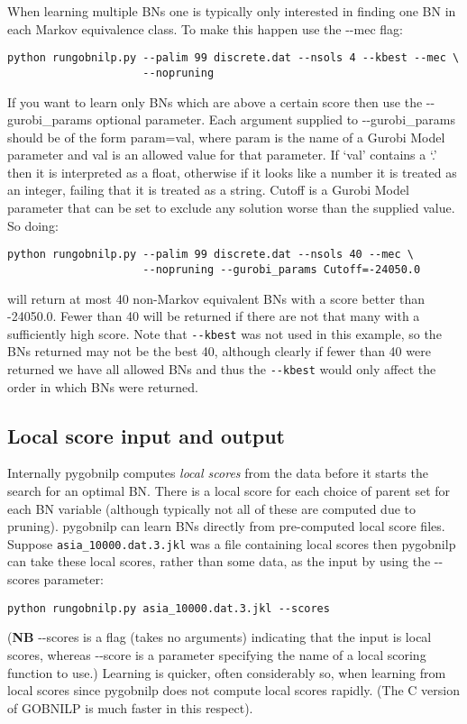 \documentclass{article}
\newcommand{\pygobnilp}{\textsf{pygobnilp}}
\begin{document}
When learning multiple BNs one is typically only interested in finding
one BN in each Markov equivalence class. To make this happen use the
-{}-mec flag:

\begin{verbatim}
python rungobnilp.py --palim 99 discrete.dat --nsols 4 --kbest --mec \
                     --nopruning
\end{verbatim}

If you want to learn only BNs which are above a certain score then use
the \mbox{-{}-gurobi\_params} optional parameter. Each argument
supplied to -{}-gurobi\_params should be of the form param=val, where
param is the name of a Gurobi Model parameter and val is an allowed
value for that parameter. If `val' contains a `.' then it is
interpreted as a float, otherwise if it looks like a number it is
treated as an integer, failing that it is treated as a string. Cutoff
is a Gurobi Model parameter that can be set to exclude any solution
worse than the supplied value. So doing:

\begin{verbatim}
python rungobnilp.py --palim 99 discrete.dat --nsols 40 --mec \
                     --nopruning --gurobi_params Cutoff=-24050.0
\end{verbatim}

will return at most 40 non-Markov equivalent BNs with a score better
than -24050.0. Fewer than 40 will be returned if there are not that
many with a sufficiently high score.  Note that \verb+--kbest+ was not
used in this example, so the BNs returned may not be the best 40,
although clearly if fewer than 40 were returned we have all allowed
BNs and thus the \verb+--kbest+ would only affect the order in which
BNs were returned.

\subsection{Local score input and output}
\label{sec:localscores}

Internally \pygobnilp{} computes \emph{local scores} from the data
before it starts the search for an optimal BN. There is a local score
for each choice of parent set for each BN variable (although typically
not all of these are computed due to pruning). \pygobnilp{} can learn
BNs directly from pre-computed local score files. Suppose
\verb+asia_10000.dat.3.jkl+ was a file containing local scores then
\pygobnilp{} can take these local scores, rather than some data, as
the input by using the -{}-scores parameter:
\begin{verbatim}
python rungobnilp.py asia_10000.dat.3.jkl --scores
\end{verbatim}
(\textbf{NB} -{}-scores is a flag (takes no arguments) indicating that
the input is local scores, whereas -{}-score is a parameter specifying
the name of a local scoring function to use.)
Learning is quicker, often considerably so, when learning from local
scores since \pygobnilp{} does not compute local scores rapidly. (The
C version of GOBNILP is much faster in this respect).
\end{document}
